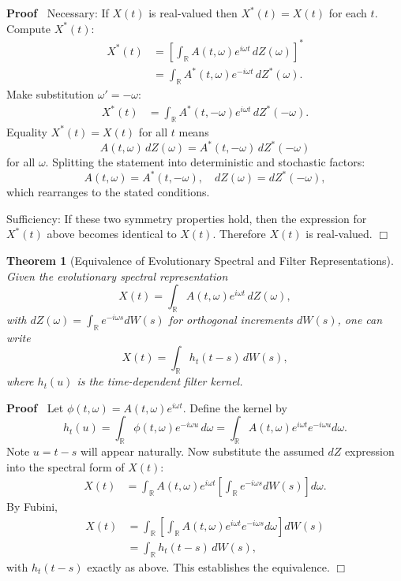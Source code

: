 \documentclass{article}
\newenvironment{proof}{\noindent\textbf{Proof\ }}{\hspace*{\fill}$\Box$\medskip}
\newtheorem{theorem}{Theorem}
\begin{document}
\begin{proof}
Necessary:  
If $X(t)$ is real-valued then $X^*(t) = X(t)$ for each $t$. Compute $X^*(t)$:
\begin{align*}
X^*(t) &= \left[ \int_{\mathbb{R}} A(t,\omega) e^{i\omega t} \, dZ(\omega) \right]^* \\
&= \int_{\mathbb{R}} A^*(t,\omega) e^{-i\omega t} \, dZ^*(\omega).
\end{align*}
Make substitution $\omega' = -\omega$:
\begin{align*}
X^*(t) &= \int_{\mathbb{R}} A^*(t,-\omega) e^{i\omega t} \, dZ^*(-\omega).
\end{align*}
Equality $X^*(t) = X(t)$ for all $t$ means
\[
A(t,\omega) \, dZ(\omega) = A^*(t,-\omega) \, dZ^*(-\omega)
\]
for all $\omega$. Splitting the statement into deterministic and stochastic factors:
\[
A(t,\omega) = A^*(t,-\omega), \quad dZ(\omega) = dZ^*(-\omega),
\]
which rearranges to the stated conditions.

Sufficiency:  
If these two symmetry properties hold, then the expression for $X^*(t)$ above becomes identical to $X(t)$. Therefore $X(t)$ is real-valued.
\end{proof}

\begin{theorem}
  [Equivalence of Evolutionary Spectral and Filter Representations]
  Given the evolutionary spectral representation
  \[
  X(t) = \int_{\mathbb{R}} A(t,\omega) e^{i\omega t} \, dZ(\omega),
  \]
  with $dZ(\omega) = \int_{\mathbb{R}} e^{-i\omega s} dW(s)$ for orthogonal increments $dW(s)$,
  one can write
  \[
  X(t) = \int_{\mathbb{R}} h_t(t-s) \, dW(s),
  \]
  where $h_t(u)$ is the time-dependent filter kernel.
\end{theorem}

\begin{proof}
Let $\phi(t,\omega) = A(t,\omega) e^{i\omega t}$. Define the kernel by
\[
h_t(u) = \int_{\mathbb{R}} \phi(t,\omega) e^{-i\omega u} \, d\omega
       = \int_{\mathbb{R}} A(t,\omega) e^{i\omega t} e^{-i\omega u} d\omega.
\]
Note $u = t-s$ will appear naturally. Now substitute the assumed $dZ$ expression into the spectral form of $X(t)$:
\begin{align*}
X(t) &= \int_{\mathbb{R}} A(t,\omega) e^{i\omega t} \left[ \int_{\mathbb{R}} e^{-i\omega s} dW(s) \right] d\omega.
\end{align*}
By Fubini,
\begin{align*}
X(t) &= \int_{\mathbb{R}} \left[ \int_{\mathbb{R}} A(t,\omega) e^{i\omega t} e^{-i\omega s} d\omega \right] dW(s) \\
&= \int_{\mathbb{R}} h_t(t-s) \, dW(s),
\end{align*}
with $h_t(t-s)$ exactly as above. This establishes the equivalence.
\end{proof}
\end{document}
